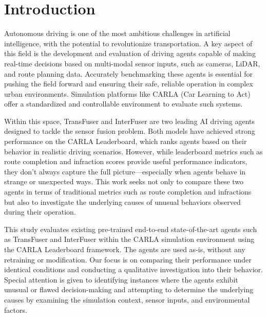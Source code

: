 \section{Introduction}
\label{sec:intro}

Autonomous driving is one of the most ambitious challenges in artificial intelligence, with the potential to revolutionize transportation. A key aspect of this field is the development and evaluation of driving agents capable of making real-time decisions based on multi-modal sensor inputs, such as cameras, LiDAR, and route planning data. Accurately benchmarking these agents is essential for pushing the field forward and ensuring their safe, reliable operation in complex urban environments. Simulation platforms like CARLA (Car Learning to Act) offer a standardized and controllable environment to evaluate such systems.
    
Within this space, TransFuser and InterFuser are two leading AI driving agents designed to tackle the sensor fusion problem. Both models have achieved strong performance on the CARLA Leaderboard, which ranks agents based on their behavior in realistic driving scenarios. However, while leaderboard metrics such as route completion and infraction scores provide useful performance indicators, they don’t always capture the full picture—especially when agents behave in strange or unexpected ways. This work seeks not only to compare these two agents in terms of traditional metrics such as route completion and infractions but also to investigate the underlying causes of unusual behaviors observed during their operation.

This study evaluates existing pre-trained end-to-end state-of-the-art agents such as TransFuser and InterFuser within the CARLA simulation environment using the CARLA Leaderboard framework. The agents are used as-is, without any retraining or modification. Our focus is on comparing their performance under identical conditions and conducting a qualitative investigation into their behavior. Special attention is given to identifying instances where the agents exhibit unusual or flawed decision-making and attempting to determine the underlying causes by examining the simulation context, sensor inputs, and environmental factors.